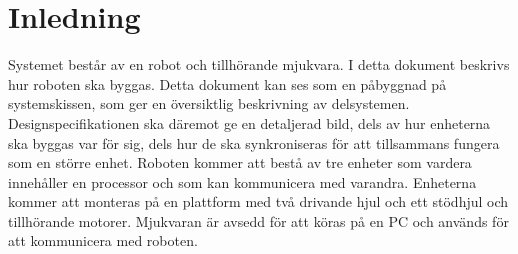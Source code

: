 \section{Inledning}
Systemet består av en robot och tillhörande mjukvara. I detta dokument beskrivs hur roboten ska byggas. Detta dokument kan ses som en påbyggnad på systemskissen, som ger en översiktlig beskrivning av delsystemen. Designspecifikationen ska däremot ge en detaljerad bild, dels av hur enheterna ska byggas var för sig, dels hur de ska synkroniseras för att tillsammans fungera som en större enhet.
Roboten kommer att bestå av tre enheter som vardera innehåller en processor och som kan kommunicera med varandra. 
Enheterna kommer att monteras på en plattform med två drivande hjul och ett stödhjul och tillhörande motorer.
Mjukvaran är avsedd för att köras på en PC och används för att kommunicera med roboten.